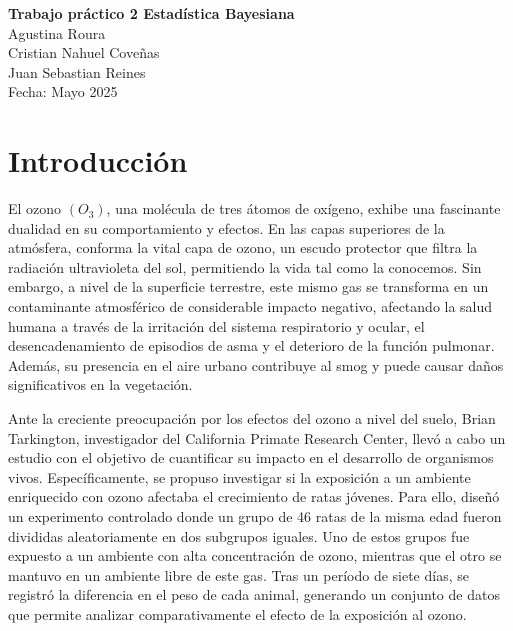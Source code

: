 \documentclass[
]{article}
\author{}
\date{\vspace{-2.5em}}
\begin{document}
\begin{titlepage}
\centering
\vspace*{4cm} %

{\Huge \textbf{Trabajo práctico 2 Estadística Bayesiana}}\\[2cm]

{\Large Agustina Roura}\\[0.5cm]
{\Large Cristian Nahuel Coveñas}\\[0.5cm]
{\Large Juan Sebastian Reines}\\[2cm]

{\large Fecha: Mayo 2025}

\vfill

\end{titlepage}

\newpage

\section{Introducción}\label{introducciuxf3n}

El ozono \((O_3)\), una molécula de tres átomos de oxígeno, exhibe una
fascinante dualidad en su comportamiento y efectos. En las capas
superiores de la atmósfera, conforma la vital capa de ozono, un escudo
protector que filtra la radiación ultravioleta del sol, permitiendo la
vida tal como la conocemos. Sin embargo, a nivel de la superficie
terrestre, este mismo gas se transforma en un contaminante atmosférico
de considerable impacto negativo, afectando la salud humana a través de
la irritación del sistema respiratorio y ocular, el desencadenamiento de
episodios de asma y el deterioro de la función pulmonar. Además, su
presencia en el aire urbano contribuye al smog y puede causar daños
significativos en la vegetación.

Ante la creciente preocupación por los efectos del ozono a nivel del
suelo, Brian Tarkington, investigador del California Primate Research
Center, llevó a cabo un estudio con el objetivo de cuantificar su
impacto en el desarrollo de organismos vivos. Específicamente, se
propuso investigar si la exposición a un ambiente enriquecido con ozono
afectaba el crecimiento de ratas jóvenes. Para ello, diseñó un
experimento controlado donde un grupo de 46 ratas de la misma edad
fueron divididas aleatoriamente en dos subgrupos iguales. Uno de estos
grupos fue expuesto a un ambiente con alta concentración de ozono,
mientras que el otro se mantuvo en un ambiente libre de este gas. Tras
un período de siete días, se registró la diferencia en el peso de cada
animal, generando un conjunto de datos que permite analizar
comparativamente el efecto de la exposición al ozono.
\end{document}

